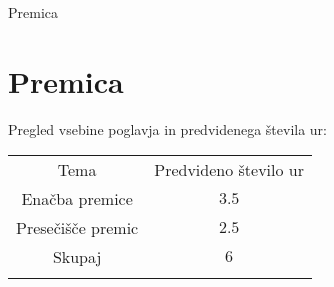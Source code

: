 \begin{priprava}{0}{}{}{Premica}{}{}
    
    \chapter{Premica}

    \Large{Pregled vsebine poglavja in predvidenega števila ur:}

    \begin{table}[H]
        \centering
        \begin{tabular}{||c|c||} 
        \hhline{|t:==:t|}
        \rowcolor[rgb]{0.843,0.718,0.718} 
        Tema  & Predvideno število ur   \\ 
        \hhline{|:==:|}
        Enačba premice & $3.5$    \\ 
        \hline
        Presečišče premic & $2.5$    \\ 
        \hhline{|:==:|}
        Skupaj & $6$     \\
        \hhline{|b:==:b|}
        \end{tabular}
    \end{table}


    
\end{priprava}